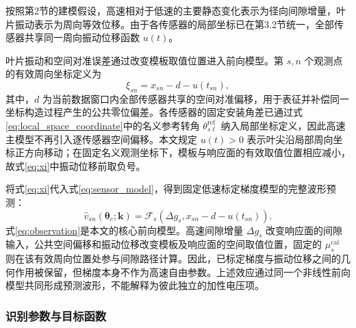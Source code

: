 \documentclass[UTF8,12pt,a4paper]{ctexart}
\newcommand{\Fsen}{\mathcal{F}}
\begin{document}
按照第2节的建模假设，高速相对于低速的主要静态变化表示为径向间隙增量，叶片振动表示为周向等效位移。由于各传感器的局部坐标已在第3.2节统一，全部传感器共享同一周向振动位移函数 $u(t)$。

叶片振动和空间对准误差通过改变模板取值位置进入前向模型。第 $s,n$ 个观测点的有效周向坐标定义为
\begin{equation}
\xi_{sn}=x_{sn}-d-u(t_{sn}),
\label{eq:xi}
\end{equation}
其中，$d$ 为当前数据窗口内全部传感器共享的空间对准偏移，用于表征并补偿同一坐标构造过程产生的公共零位偏差。各传感器的固定安装角差已通过式\eqref{eq:local_space_coordinate}中的名义参考转角 $\theta_{s\ell}^{\mathrm{ref}}$ 纳入局部坐标定义，因此高速主模型不再引入逐传感器空间偏移。本文规定 $u(t)>0$ 表示叶尖沿局部周向坐标正方向移动；在固定名义观测坐标下，模板与响应面的有效取值位置相应减小，故式\eqref{eq:xi}中振动位移前取负号。

将式\eqref{eq:xi}代入式\eqref{eq:sensor_model}，得到固定低速标定梯度模型的完整波形预测：
\begin{equation}
\widehat v_{sn}(\bm\theta_c;\bm k)
=\Fsen_s\!\left(
\Delta g_s,
x_{sn}-d-u(t_{sn})
\right).
\label{eq:observation}
\end{equation}
式\eqref{eq:observation}是本文的核心前向模型。高速间隙增量 $\Delta g_s$ 改变响应面的间隙输入，公共空间偏移和振动位移改变模板及响应面的空间取值位置，固定的 $\mu_s^{\mathrm{cal}}$ 则在该有效周向位置处参与间隙路径计算。因此，已标定梯度与振动位移之间的几何作用被保留，但梯度本身不作为高速自由参数。上述效应通过同一个非线性前向模型共同形成预测波形，不能解释为彼此独立的加性电压项。

\subsubsection{识别参数与目标函数}
\end{document}
